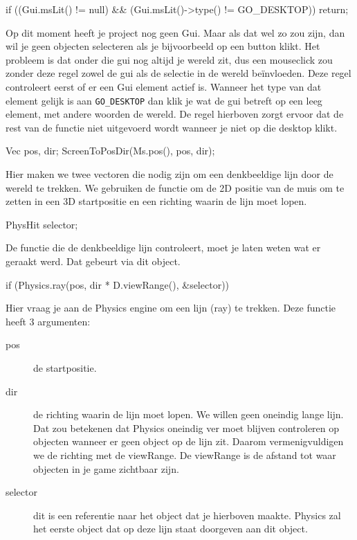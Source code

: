 \begin{code}
if ((Gui.msLit() != null) && (Gui.msLit()->type() != GO_DESKTOP)) return;
\end{code}

Op dit moment heeft je project nog geen Gui. Maar als dat wel zo zou zijn, dan wil je geen objecten selecteren als je bijvoorbeeld op een button klikt. Het probleem is dat onder die gui nog altijd je wereld zit, dus een mouseclick zou zonder deze regel zowel de gui als de selectie in de wereld be\"invloeden. Deze regel controleert eerst of er een Gui element actief is. Wanneer het type van dat element gelijk is aan \texttt{GO\_DESKTOP} dan klik je wat de gui betreft op een leeg element, met andere woorden de wereld. De regel hierboven zorgt ervoor dat de rest van de functie niet uitgevoerd wordt wanneer je niet op die desktop klikt.

\begin{code}
Vec pos, dir;      
ScreenToPosDir(Ms.pos(), pos, dir);
\end{code}

Hier maken we twee vectoren die nodig zijn om een denkbeeldige lijn door de wereld te trekken. We gebruiken de functie  om de 2D positie van de muis om te zetten in een 3D startpositie en een richting waarin de lijn moet lopen.

\begin{code}
PhysHit selector;
\end{code}

De functie die de denkbeeldige lijn controleert, moet je laten weten wat er geraakt werd. Dat gebeurt via dit object.

\begin{code}
if (Physics.ray(pos, dir * D.viewRange(), &selector))
\end{code}

Hier vraag je aan de Physics engine om een lijn (ray) te trekken. Deze functie heeft 3 argumenten:

\begin{description}
	\item[pos] de startpositie.
	\item[dir] de richting waarin de lijn moet lopen. We willen geen oneindig lange lijn. Dat zou betekenen dat Physics oneindig ver moet blijven controleren op objecten wanneer er geen object op de lijn zit. Daarom vermenigvuldigen we de richting met de viewRange. De viewRange is de afstand tot waar objecten in je game zichtbaar zijn.
	\item[selector] dit is een referentie naar het  object dat je hierboven maakte. Physics zal het eerste object dat op deze lijn staat doorgeven aan dit object.
\end{description}

